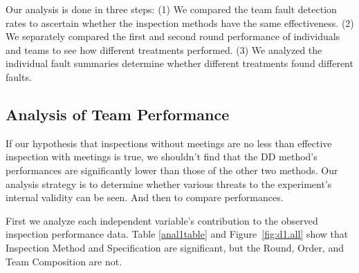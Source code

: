 Our analysis is done in three steps: (1) We compared the 
team fault detection rates to ascertain whether the 
inspection methods have the same effectiveness. (2) We separately compared
the first and second round performance of individuals and teams 
to see how different treatments performed. (3) We 
analyzed the individual fault summaries determine whether different treatments 
found different faults.


\subsection{Analysis of Team Performance}

If our hypothesis that inspections without meetings are
no less than effective inspection with meetings
is true, we shouldn't find that the DD method's 
performances are significantly lower than 
those of the other two methods.
Our analysis strategy is to determine whether various 
threats to the experiment's internal validity can be seen.
And then to compare performances.

First we analyze each independent 
variable's contribution to the observed inspection performance data. 
Table \ref{anal1table} and Figure~\ref{fig:d1.all} show that 
Inspection Method and Specification 
are significant, but the Round, Order, and Team Composition are not.

